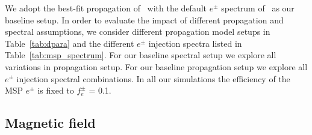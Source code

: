 \documentclass[doublespace,nopageskip]{VTthesis}
\begin{document}
We adopt the best-fit propagation of~\citet{2016ApJ...824...16J} with the default $e^\pm$ spectrum of~\citet{2015ApJ...802..124Y} as our baseline setup. In order to evaluate the impact of different propagation and spectral assumptions, we consider different propagation model setups in Table~\ref{tab:dpara} and the different $e^{\pm}$ injection spectra listed in Table~\ref{tab:msp_spectrum}. For our baseline spectral setup we explore all variations in propagation setup. For our baseline propagation setup we explore all $e^{\pm}$ injection spectral combinations. In all our simulations the efficiency of the MSP $e^\pm$ is fixed to $f_e^\pm$ = 0.1.

\subsection{Magnetic field}\label{sec:bfield}
\end{document}
